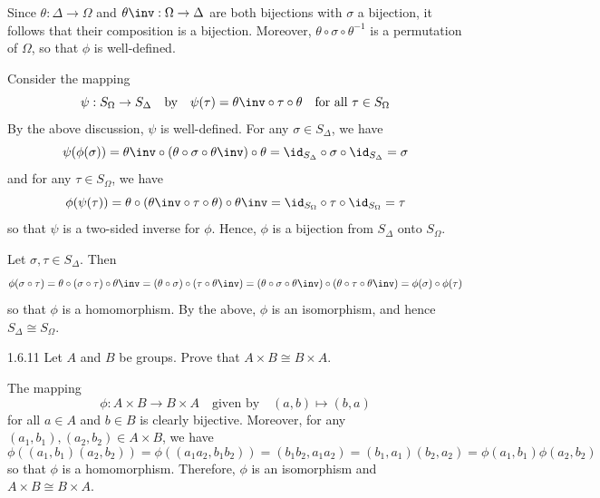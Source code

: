 \begin{solenum}
    \item Since $\theta : \Delta \to \Omega$ and $\theta\inv : \Omega \to \Delta$ are both bijections with $\sigma$ a bijection, it follows that their composition is a bijection.
	Moreover, $\theta \circ \sigma \circ \theta^{-1}$ is a permutation of $\Omega$, so that $\phi$ is well-defined.
    \item Consider the mapping 
    \[
    	\psi : S_\Omega \to S_\Delta\quad \text{by} \quad \psi(\tau) = \theta\inv \circ \tau \circ \theta \quad \text{for all } \tau \in S_\Omega
    \]
    By the above discussion, $\psi$ is well-defined.
	For any $\sigma \in S_\Delta$, we have
    \[
    	\psi(\phi(\sigma)) = \theta\inv \circ (\theta \circ \sigma \circ \theta\inv) \circ \theta = \id_{S_\Delta} \circ \sigma \circ \id_{S_\Delta} = \sigma
    \]
    and for any $\tau \in S_\Omega$, we have
    \[
    	\phi(\psi(\tau)) = \theta \circ (\theta\inv \circ \tau \circ \theta) \circ \theta\inv = \id_{S_\Omega} \circ \tau \circ \id_{S_\Omega} = \tau
    \]
    so that $\psi$ is a two-sided inverse for $\phi$.
	Hence, $\phi$ is a bijection from $S_\Delta$ onto $S_\Omega$.
    \item Let $\sigma, \tau \in S_\Delta$.
	Then
    \[
    	\phi(\sigma \circ \tau) = \theta \circ (\sigma \circ \tau) \circ \theta\inv = (\theta \circ \sigma) \circ (\tau \circ \theta\inv) = (\theta \circ \sigma \circ \theta\inv) \circ (\theta \circ \tau \circ \theta\inv) = \phi(\sigma) \circ \phi(\tau)
    \]
    so that $\phi$ is a homomorphism.
	By the above, $\phi$ is an isomorphism, and hence $S_\Delta \cong S_\Omega$.
\end{solenum}

\begin{exercise}{1.6.11}
    Let $A$ and $B$ be groups.
	Prove that $A \times B \cong B \times A$.
\end{exercise}

\begin{sol}
    The mapping
    \[
    	\phi : A \times B \to B \times A \quad \text{given by} \quad (a, b) \mapsto (b, a)
    \]
    for all $a \in A$ and $b \in B$ is clearly bijective.
	Moreover, for any $(a_1, b_1), (a_2, b_2) \in A \times B$, we have
    \[
    	\phi((a_1, b_1)(a_2, b_2)) = \phi((a_1a_2, b_1b_2)) = (b_1b_2, a_1a_2) = (b_1, a_1)(b_2, a_2) = \phi(a_1, b_1)\phi(a_2, b_2)
    \]
    so that $\phi$ is a homomorphism.
	Therefore, $\phi$ is an isomorphism and $A \times B \cong B \times A$.
\end{sol}

